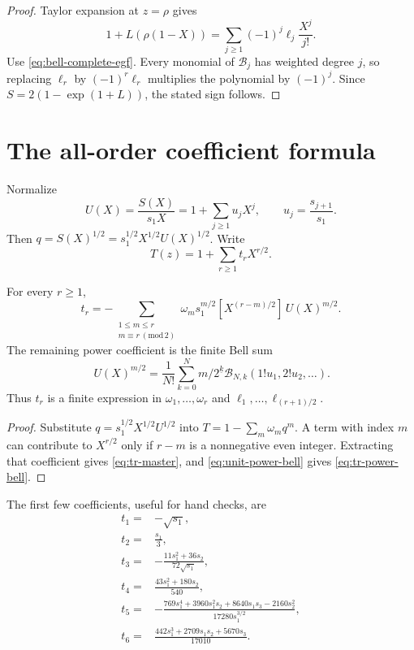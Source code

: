 \documentclass[11pt,a4paper,oneside,openany]{book}
\theoremstyle{definition}
\theoremstyle{remark}
\newcommand{\Coeff}[3]{[ #1^{#2}]\,#3}
\newcommand{\Bell}[1]{\mathcal B_{#1}}
\newcommand{\pBell}[2]{\mathcal B_{#1,#2}}
\newcommand{\falling}[2]{#1^{\underline{#2}}}
\begin{document}
\begin{proof}
Taylor expansion at $z=\rho$ gives
\[
 1+L(\rho(1-X))
 =\sum_{j\ge1}(-1)^j\ell_j\frac{X^j}{j!}.
\]
Use \cref{eq:bell-complete-egf}.  Every monomial of
$\Bell j$ has weighted degree $j$, so replacing $\ell_r$ by
$(-1)^r\ell_r$ multiplies the polynomial by $(-1)^j$.  Since
$S=2(1-\exp(1+L))$, the stated sign follows.
\end{proof}

\section{The all-order coefficient formula}
Normalize
\begin{equation}
 U(X)=\frac{S(X)}{s_1X}
 =1+\sum_{j\ge1}u_jX^j,
 \qquad
 u_j=\frac{s_{j+1}}{s_1}.
 \label{eq:U-def}
\end{equation}
Then $q=S(X)^{1/2}=s_1^{1/2}X^{1/2}U(X)^{1/2}$.  Write
\begin{equation}
 T(z)=1+\sum_{r\ge1}t_rX^{r/2}.
 \label{eq:puiseux-def}
\end{equation}

\begin{resultbox}[title={All Puiseux coefficients}]
For every $r\ge1$,
\begin{equation}
 \boxed{
 t_r=-\!\sum_{\substack{1\le m\le r\\m\equiv r\ (\mathrm{mod}\,2)}}
 \omega_m s_1^{m/2}
 \Coeff X{(r-m)/2}{U(X)^{m/2}}.}
 \label{eq:tr-master}
\end{equation}
The remaining power coefficient is the finite Bell sum
\begin{equation}
 \Coeff XN{U(X)^{m/2}}
 =\frac1{N!}\sum_{k=0}^N\falling{m/2}k
 \pBell Nk(1!u_1,2!u_2,\ldots).
 \label{eq:tr-power-bell}
\end{equation}
Thus $t_r$ is a finite expression in $\omega_1,\ldots,\omega_r$ and
$\ell_1,\ldots,\ell_{(r+1)/2}$.
\end{resultbox}

\begin{proof}
Substitute $q=s_1^{1/2}X^{1/2}U^{1/2}$ into
$T=1-\sum_m\omega_mq^m$.  A term with index $m$ can contribute to
$X^{r/2}$ only if $r-m$ is a nonnegative even integer.  Extracting that
coefficient gives \cref{eq:tr-master}, and
\cref{eq:unit-power-bell} gives \cref{eq:tr-power-bell}.
\end{proof}

The first few coefficients, useful for hand checks, are
\begin{align}
 t_1={}&-\sqrt{s_1},\label{eq:t1}\\
 t_2={}&\frac{s_1}{3},\label{eq:t2}\\
 t_3={}&-\frac{11s_1^2+36s_2}{72\sqrt{s_1}},\label{eq:t3}\\
 t_4={}&\frac{43s_1^2+180s_2}{540},\label{eq:t4}\\
 t_5={}&-\frac{769s_1^4+3960s_1^2s_2+8640s_1s_3-2160s_2^2}
 {17280s_1^{3/2}},\label{eq:t5}\\
 t_6={}&\frac{442s_1^3+2709s_1s_2+5670s_3}{17010}.
 \label{eq:t6}
\end{align}
\end{document}
